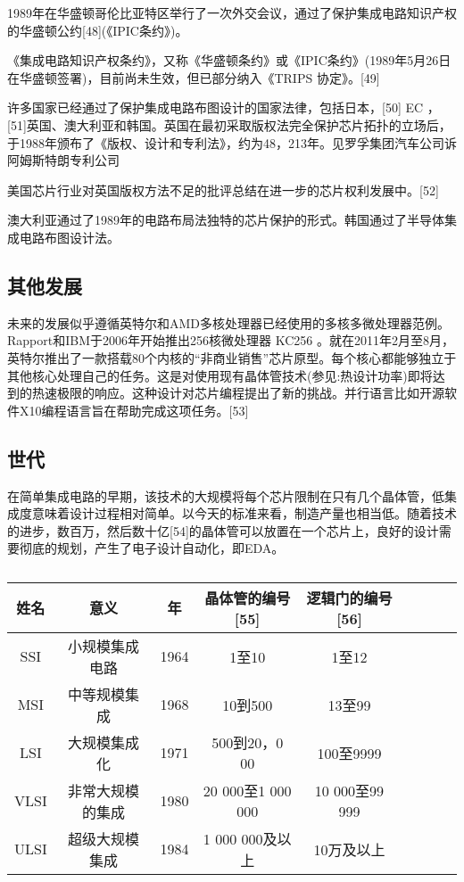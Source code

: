 1989年在华盛顿哥伦比亚特区举行了一次外交会议，通过了保护集成电路知识产权的华盛顿公约[48](《IPIC条约》)。

《集成电路知识产权条约》，又称《华盛顿条约》或《IPIC条约》(1989年5月26日在华盛顿签署)，目前尚未生效，但已部分纳入《TRIPS 协定》。[49]

许多国家已经通过了保护集成电路布图设计的国家法律，包括日本，[50] EC ，[51]英国、澳大利亚和韩国。英国在最初采取版权法完全保护芯片拓扑的立场后，于1988年颁布了《版权、设计和专利法》，约为48，213年。见罗孚集团汽车公司诉阿姆斯特朗专利公司

美国芯片行业对英国版权方法不足的批评总结在进一步的芯片权利发展中。[52]

澳大利亚通过了1989年的电路布局法独特的芯片保护的形式。韩国通过了半导体集成电路布图设计法。

\subsection{其他发展}

未来的发展似乎遵循英特尔和AMD多核处理器已经使用的多核多微处理器范例。Rapport和IBM于2006年开始推出256核微处理器 KC256 。就在2011年2月至8月，英特尔推出了一款搭载80个内核的“非商业销售”芯片原型。每个核心都能够独立于其他核心处理自己的任务。这是对使用现有晶体管技术(参见:热设计功率)即将达到的热速极限的响应。这种设计对芯片编程提出了新的挑战。并行语言比如开源软件X10编程语言旨在帮助完成这项任务。[53]

\subsection{世代}

在简单集成电路的早期，该技术的大规模将每个芯片限制在只有几个晶体管，低集成度意味着设计过程相对简单。以今天的标准来看，制造产量也相当低。随着技术的进步，数百万，然后数十亿[54]的晶体管可以放置在一个芯片上，良好的设计需要彻底的规划，产生了电子设计自动化，即EDA。

\begin{table}[ht]
\centering
\caption\label{tab_icJCDL}
\begin{tabular}{|c|c|c|c|c|c|c|c|c}
\hline
\textbf{姓名}&\textbf{意义}& \textbf{年}&\textbf{晶体管的编号[55]}&\textbf{逻辑门的编号[56]} \\
\hline
SSI & 小规模集成电路 & 1964 & 1至10 & 1至12\\
\hline
MSI & 中等规模集成 & 1968 & 10到500 & 13至99 \\
\hline
LSI & 大规模集成化 & 1971 & 500到20，0 00 & 100至9999 \\
\hline
VLSI & 非常大规模的集成 & 1980 & 20 000至1 000 000 & 10 000至99 999 \\
\hline
ULSI & 超级大规模集成 & 1984 & 1 000 000及以上 & 10万及以上 \\
\hline
\end{tabular}
\end{table}

